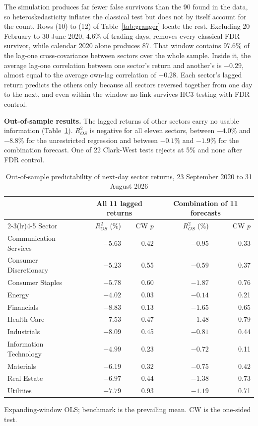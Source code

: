 \documentclass[11pt]{article}
\begin{document}
The simulation produces far fewer false survivors than the 90 found in the data, so heteroskedasticity inflates the classical test but does not by itself account for the count. Rows (10) to (12) of Table~\ref{tab:granger} locate the rest. Excluding 20 February to 30 June 2020, 4.6\% of trading days, removes every classical FDR survivor, while calendar 2020 alone produces 87. That window contains 97.6\% of the lag-one cross-covariance between sectors over the whole sample. Inside it, the average lag-one correlation between one sector's return and another's is $-0.29$, almost equal to the average own-lag correlation of $-0.28$. Each sector's lagged return predicts the others only because all sectors reversed together from one day to the next, and even within the window no link survives HC3 testing with FDR control.

\textbf{Out-of-sample results.} The lagged returns of other sectors carry no usable information (Table~\ref{tab:oos}). $R^2_{OS}$ is negative for all eleven sectors, between $-4.0\%$ and $-8.8\%$ for the unrestricted regression and between $-0.1\%$ and $-1.9\%$ for the combination forecast. One of 22 Clark-West tests rejects at 5\% and none after FDR control.

\begin{table}[H]
\centering
\caption{Out-of-sample predictability of next-day sector returns, 23 September 2020 to 31 August 2026}
\label{tab:oos}
\small
\begin{tabular}{lrrrr}
\toprule
& \multicolumn{2}{c}{All 11 lagged returns} & \multicolumn{2}{c}{Combination of 11 forecasts} \\
\cmidrule(lr){2-3}\cmidrule(lr){4-5}
Sector & $R^2_{OS}$ (\%) & CW $p$ & $R^2_{OS}$ (\%) & CW $p$ \\
\midrule
Communication Services & $-5.63$ & 0.42 & $-0.95$ & 0.33 \\
Consumer Discretionary & $-5.23$ & 0.55 & $-0.59$ & 0.37 \\
Consumer Staples & $-5.78$ & 0.60 & $-1.87$ & 0.76 \\
Energy & $-4.02$ & 0.03 & $-0.14$ & 0.21 \\
Financials & $-8.83$ & 0.13 & $-1.65$ & 0.65 \\
Health Care & $-7.53$ & 0.47 & $-1.48$ & 0.79 \\
Industrials & $-8.09$ & 0.45 & $-0.81$ & 0.44 \\
Information Technology & $-4.99$ & 0.23 & $-0.72$ & 0.11 \\
Materials & $-6.19$ & 0.32 & $-0.75$ & 0.42 \\
Real Estate & $-6.97$ & 0.44 & $-1.38$ & 0.73 \\
Utilities & $-7.79$ & 0.93 & $-1.19$ & 0.71 \\
\bottomrule
\end{tabular}

\smallskip
\parbox{0.95\textwidth}{\footnotesize Expanding-window OLS; benchmark is the prevailing mean. CW is the one-sided \citet{clark2007} test.}
\end{table}
\end{document}
